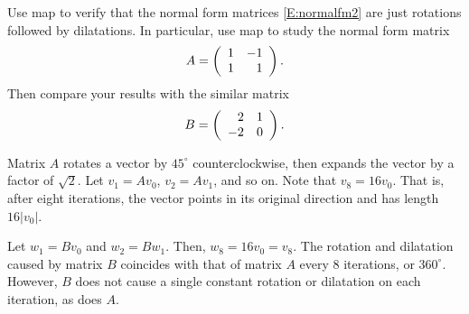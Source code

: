 \documentclass{ximera}
\begin{document}
\begin{exercise} \label{c10.4.rotate}
Use {\sf map} to verify that 
the normal form matrices \eqref{E:normalfm2} are 
just rotations followed by dilatations.  In particular, use {\sf map} to 
study the normal form matrix
\[
A = \left(\begin{array}{rr} 1 & -1\\ 1 &1\end{array}\right).
\]
Then compare your results with the similar matrix
\[
B = \left(\begin{array}{rr} 2 & 1\\ -2 &0\end{array}\right).
\]

\begin{solution}

Matrix $A$ rotates a vector by $45^{\circ}$ counterclockwise, then expands
the vector by a factor of $\sqrt{2}$.  Let $v_1 = Av_0$, $v_2 =
Av_1$, and so on.  Note that $v_8 = 16v_0$.  That is, after eight
iterations, the vector points in its original direction and has length
$16|v_0|$.

\para Let $w_1 = Bv_0$ and $w_2 = Bw_1$.  Then, $w_8 = 16v_0
= v_8$.  The rotation and dilatation caused by matrix $B$ coincides
with that of matrix $A$ every 8 iterations, or $360^\circ$.  However,
$B$ does not cause a single constant rotation or dilatation on each
iteration, as does $A$.

\end{solution}
\end{exercise}
\end{document}
